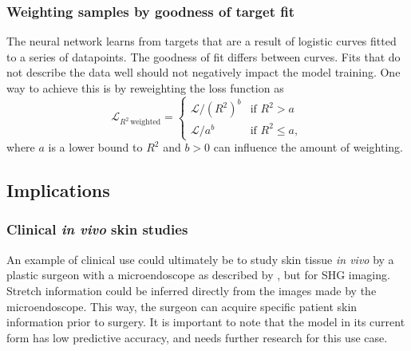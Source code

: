 \subsubsection{Weighting samples by goodness of target fit}
The neural network learns from targets that are a result of logistic curves fitted to a series of datapoints.
The goodness of fit differs between curves.
Fits that do not describe the data well should not negatively impact the model training.
One way to achieve this is by reweighting the loss function as
\begin{equation}
    \mathcal{L}_{R^2\,\mathrm{weighted}} =
    \begin{cases}
        \mathcal{L} / \left(R^2\right)^b & \text{if } R^2 > a     \\
        \mathcal{L} / a^b                & \text{if } R^2 \leq a,
    \end{cases}
\end{equation}
where $a$ is a lower bound to $R^2$ and $b > 0$ can influence the amount of weighting.

\subsection{Implications}
\subsubsection{Clinical \emph{in vivo} skin studies}
An example of clinical use could ultimately be to study skin tissue \emph{in vivo} by a plastic surgeon with a microendoscope as described by \textcite{Kuzmin2016}, but for SHG imaging.
Stretch information could be inferred directly from the images made by the microendoscope.
This way, the surgeon can acquire specific patient skin information prior to surgery.
It is important to note that the model in its current form has low predictive accuracy, and needs further research for this use case.
